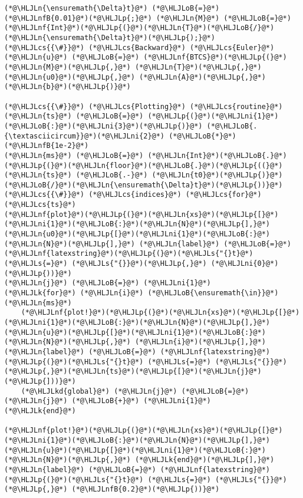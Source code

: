 \documentclass[12pt,a4paper]{article}
\newcommand{\HLJLk}[1]{\textcolor[RGB]{148,91,176}{\textbf{#1}}}
\newcommand{\HLJLkd}[1]{\textcolor[RGB]{214,102,97}{\textit{#1}}}
\newcommand{\HLJLn}[1]{#1}
\newcommand{\HLJLnf}[1]{\textcolor[RGB]{66,102,213}{#1}}
\newcommand{\HLJLs}[1]{\textcolor[RGB]{201,61,57}{#1}}
\newcommand{\HLJLnfB}[1]{\textcolor[RGB]{59,151,46}{#1}}
\newcommand{\HLJLni}[1]{\textcolor[RGB]{59,151,46}{#1}}
\newcommand{\HLJLoB}[1]{\textcolor[RGB]{102,102,102}{\textbf{#1}}}
\newcommand{\HLJLp}[1]{#1}
\newcommand{\HLJLcs}[1]{\textcolor[RGB]{153,153,119}{\textit{#1}}}
\begin{document}
\begin{lstlisting}
(*@\HLJLn{\ensuremath{\Delta}t}@*) (*@\HLJLoB{=}@*) (*@\HLJLnfB{0.01}@*)(*@\HLJLp{;}@*) (*@\HLJLn{M}@*) (*@\HLJLoB{=}@*) (*@\HLJLnf{Int}@*)(*@\HLJLp{(}@*)(*@\HLJLn{T}@*)(*@\HLJLoB{/}@*)(*@\HLJLn{\ensuremath{\Delta}t}@*)(*@\HLJLp{);}@*)
(*@\HLJLcs{{\#}}@*) (*@\HLJLcs{Backward}@*) (*@\HLJLcs{Euler}@*)
(*@\HLJLn{u}@*) (*@\HLJLoB{=}@*) (*@\HLJLnf{BTCS}@*)(*@\HLJLp{(}@*)(*@\HLJLn{M}@*)(*@\HLJLp{,}@*) (*@\HLJLn{T}@*)(*@\HLJLp{,}@*) (*@\HLJLn{u0}@*)(*@\HLJLp{,}@*) (*@\HLJLn{A}@*)(*@\HLJLp{,}@*) (*@\HLJLn{b}@*)(*@\HLJLp{)}@*)

(*@\HLJLcs{{\#}}@*) (*@\HLJLcs{Plotting}@*) (*@\HLJLcs{routine}@*)
(*@\HLJLn{ts}@*) (*@\HLJLoB{=}@*) (*@\HLJLp{(}@*)(*@\HLJLni{1}@*)(*@\HLJLoB{:}@*)(*@\HLJLni{3}@*)(*@\HLJLp{)}@*) (*@\HLJLoB{.{\textasciicircum}}@*)(*@\HLJLni{2}@*) (*@\HLJLoB{*}@*) (*@\HLJLnfB{1e-2}@*)
(*@\HLJLn{ms}@*) (*@\HLJLoB{=}@*) (*@\HLJLn{Int}@*)(*@\HLJLoB{.}@*)(*@\HLJLp{(}@*)(*@\HLJLn{floor}@*)(*@\HLJLoB{.}@*)(*@\HLJLp{((}@*)(*@\HLJLn{ts}@*) (*@\HLJLoB{.-}@*) (*@\HLJLn{t0}@*)(*@\HLJLp{)}@*)(*@\HLJLoB{/}@*)(*@\HLJLn{\ensuremath{\Delta}t}@*)(*@\HLJLp{))}@*)(*@\HLJLcs{{\#}}@*) (*@\HLJLcs{indices}@*) (*@\HLJLcs{for}@*) (*@\HLJLcs{ts}@*)
(*@\HLJLnf{plot}@*)(*@\HLJLp{(}@*)(*@\HLJLn{xs}@*)(*@\HLJLp{[}@*)(*@\HLJLni{1}@*)(*@\HLJLoB{:}@*)(*@\HLJLn{N}@*)(*@\HLJLp{],}@*) (*@\HLJLn{u0}@*)(*@\HLJLp{[}@*)(*@\HLJLni{1}@*)(*@\HLJLoB{:}@*)(*@\HLJLn{N}@*)(*@\HLJLp{],}@*) (*@\HLJLn{label}@*) (*@\HLJLoB{=}@*) (*@\HLJLnf{latexstring}@*)(*@\HLJLp{(}@*)(*@\HLJLs{"{}t}@*) (*@\HLJLs{=}@*) (*@\HLJLs{"{}}@*)(*@\HLJLp{,}@*) (*@\HLJLni{0}@*) (*@\HLJLp{))}@*)
(*@\HLJLn{j}@*) (*@\HLJLoB{=}@*) (*@\HLJLni{1}@*)
(*@\HLJLk{for}@*) (*@\HLJLn{i}@*) (*@\HLJLoB{\ensuremath{\in}}@*) (*@\HLJLn{ms}@*)
    (*@\HLJLnf{plot!}@*)(*@\HLJLp{(}@*)(*@\HLJLn{xs}@*)(*@\HLJLp{[}@*)(*@\HLJLni{1}@*)(*@\HLJLoB{:}@*)(*@\HLJLn{N}@*)(*@\HLJLp{],}@*) (*@\HLJLn{u}@*)(*@\HLJLp{[}@*)(*@\HLJLni{1}@*)(*@\HLJLoB{:}@*)(*@\HLJLn{N}@*)(*@\HLJLp{,}@*) (*@\HLJLn{i}@*)(*@\HLJLp{],}@*) (*@\HLJLn{label}@*) (*@\HLJLoB{=}@*) (*@\HLJLnf{latexstring}@*)(*@\HLJLp{(}@*)(*@\HLJLs{"{}t}@*) (*@\HLJLs{=}@*) (*@\HLJLs{"{}}@*)(*@\HLJLp{,}@*)(*@\HLJLn{ts}@*)(*@\HLJLp{[}@*)(*@\HLJLn{j}@*)(*@\HLJLp{]))}@*)
    (*@\HLJLkd{global}@*) (*@\HLJLn{j}@*) (*@\HLJLoB{=}@*) (*@\HLJLn{j}@*) (*@\HLJLoB{+}@*) (*@\HLJLni{1}@*)
(*@\HLJLk{end}@*)

(*@\HLJLnf{plot!}@*)(*@\HLJLp{(}@*)(*@\HLJLn{xs}@*)(*@\HLJLp{[}@*)(*@\HLJLni{1}@*)(*@\HLJLoB{:}@*)(*@\HLJLn{N}@*)(*@\HLJLp{],}@*) (*@\HLJLn{u}@*)(*@\HLJLp{[}@*)(*@\HLJLni{1}@*)(*@\HLJLoB{:}@*)(*@\HLJLn{N}@*)(*@\HLJLp{,}@*) (*@\HLJLk{end}@*)(*@\HLJLp{],}@*) (*@\HLJLn{label}@*) (*@\HLJLoB{=}@*) (*@\HLJLnf{latexstring}@*)(*@\HLJLp{(}@*)(*@\HLJLs{"{}t}@*) (*@\HLJLs{=}@*) (*@\HLJLs{"{}}@*)(*@\HLJLp{,}@*) (*@\HLJLnfB{0.2}@*)(*@\HLJLp{))}@*)
\end{lstlisting}
\end{document}
